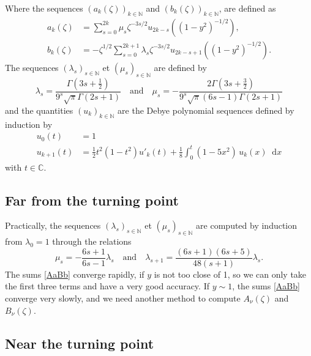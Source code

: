 \documentclass[12pt,a4paper]{article}
\numberwithin{equation}{section}
\newcommand{\bbC}{\mathbb{C}}
\newcommand{\bbN}{\mathbb{N}}
\newcommand{\di}[1]{\mathop{}\!\mathrm{d}#1}
\newcommand{\plr}[1]{\left(#1\right)}
\theoremstyle{definition}
\theoremstyle{plain}
\theoremstyle{remark}
\begin{document}
Where the sequences \( \plr{a_k(\zeta)}_{k \in \bbN} \) and \( \plr{b_k(\zeta)}_{k \in \bbN} \), are defined as
\begin{subequations}\label{abk}
    \begin{align}
        a_k(\zeta)
         & = \sum_{s=0}^{2 k} \mu_s \zeta^{-3 s/2} u_{2 k-s}\plr{\plr{1-y^2}^{-1/2}},
        \\
        b_k(\zeta)
         & = -\zeta^{1/2} \sum_{s=0}^{2 k+1} \lambda_s \zeta^{-3 s/2} u_{2 k-s+1}\plr{\plr{1-y^2}^{-1/2}}.
    \end{align}
\end{subequations}
The sequences \( \plr{\lambda_s}_{s \in \bbN} \) et \( \plr{\mu_s}_{s \in \bbN} \) are defined by
\[
    \lambda_s = \frac{\Gamma(3 s+\frac{1}{2})}{9^s \sqrt{\pi} \Gamma(2 s +1)}
    \quad \text{and} \quad
    \mu_s = -\frac{2 \Gamma(3 s+\frac{3}{2})}{9^s \sqrt{\pi} (6 s-1) \Gamma(2 s +1)}
\]
and the quantities \( \plr{u_k}_{k \in \bbN} \) are the Debye polynomial sequences defined by induction by
\begin{align*}
    u_0(t)
     & = 1
    \\
    u_{k+1}(t)
     & = \frac{1}{2} t^2 (1-t^2) u'_{k}(t) + \frac{1}{8} \int_{0}^{t} \plr{1-5 x^2} \, u_k(x) \di{x}
\end{align*}
with \( t \in \bbC \).

\subsection{Far from the turning point}

Practically, the sequences \( \plr{\lambda_s}_{s \in \bbN} \) et \( \plr{\mu_s}_{s \in \bbN} \) are computed by induction from \( \lambda_0 = 1 \) through the relations
\[
    \mu_s = -\frac{6 s +1}{6 s-1} \lambda_s
    \quad \text{and} \quad
    \lambda_{s+1} = \frac{(6 s+1) (6 s+5)}{48 (s+1)} \lambda_s.
\]
The sums \cref{AaBb} converge rapidly, if \( y \) is not too close of 1, so we can only take the first three terms and have a very good accuracy.
If \( y \sim 1 \), the sums \cref{AaBb} converge very slowly, and we need another method to compute \( A_\nu(\zeta) \) and \( B_\nu(\zeta) \).

\subsection{Near the turning point}
\end{document}
